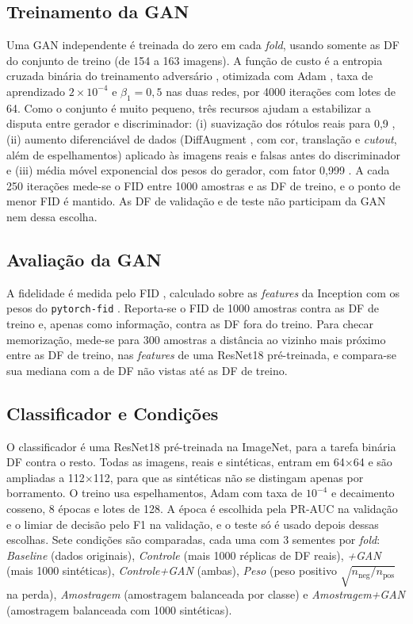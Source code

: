 \documentclass[conference]{IEEEtran}
\begin{document}
\subsection{Treinamento da GAN}
Uma GAN independente é treinada do zero em cada \textit{fold}, usando somente as DF do conjunto de treino (de 154 a 163 imagens). A função de custo é a entropia cruzada binária do treinamento adversário \cite{goodfellow2014generative}, otimizada com Adam \cite{kingma2015adam}, taxa de aprendizado $2\times10^{-4}$ e $\beta_1=0{,}5$ nas duas redes, por 4000 iterações com lotes de 64. Como o conjunto é muito pequeno, três recursos ajudam a estabilizar a disputa entre gerador e discriminador: (i) suavização dos rótulos reais para 0,9 \cite{salimans2016improved}, (ii) aumento diferenciável de dados (DiffAugment \cite{zhao2020differentiable}, com cor, translação e \textit{cutout}, além de espelhamentos) aplicado às imagens reais e falsas antes do discriminador e (iii) média móvel exponencial dos pesos do gerador, com fator 0,999 \cite{yazici2019unusual}. A cada 250 iterações mede-se o FID entre 1000 amostras e as DF de treino, e o ponto de menor FID é mantido. As DF de validação e de teste não participam da GAN nem dessa escolha.

\subsection{Avaliação da GAN}
A fidelidade é medida pelo FID \cite{heusel2017gans}, calculado sobre as \textit{features} da Inception com os pesos do \texttt{pytorch-fid} \cite{seitzer2020pytorchfid}. Reporta-se o FID de 1000 amostras contra as DF de treino e, apenas como informação, contra as DF fora do treino. Para checar memorização, mede-se para 300 amostras a distância ao vizinho mais próximo entre as DF de treino, nas \textit{features} de uma ResNet18 pré-treinada, e compara-se sua mediana com a de DF não vistas até as DF de treino.

\subsection{Classificador e Condições}
O classificador é uma ResNet18 \cite{he2016deep} pré-treinada na ImageNet, para a tarefa binária DF contra o resto. Todas as imagens, reais e sintéticas, entram em 64$\times$64 e são ampliadas a 112$\times$112, para que as sintéticas não se distingam apenas por borramento. O treino usa espelhamentos, Adam com taxa de $10^{-4}$ e decaimento cosseno, 8 épocas e lotes de 128. A época é escolhida pela PR-AUC na validação e o limiar de decisão pelo F1 na validação, e o teste só é usado depois dessas escolhas. Sete condições são comparadas, cada uma com 3 sementes por \textit{fold}:
\textit{Baseline} (dados originais), \textit{Controle} (mais 1000 réplicas de DF reais), \textit{+GAN} (mais 1000 sintéticas), \textit{Controle+GAN} (ambas), \textit{Peso} (peso positivo $\sqrt{n_\text{neg}/n_\text{pos}}$ na perda), \textit{Amostragem} (amostragem balanceada por classe) e \textit{Amostragem+GAN} (amostragem balanceada com 1000 sintéticas).
\end{document}
